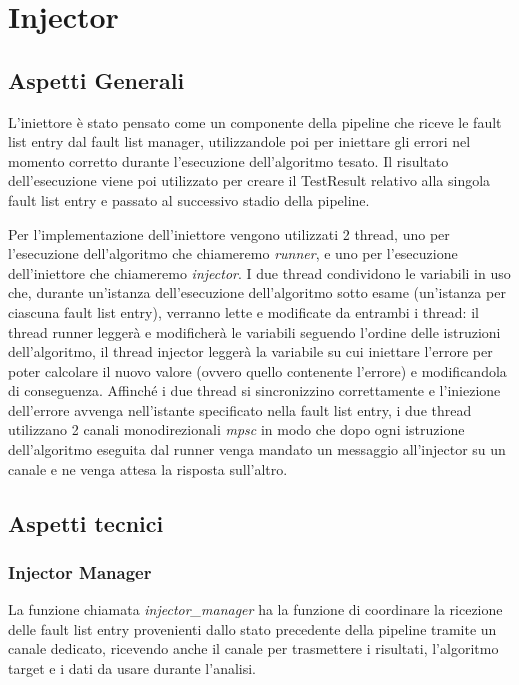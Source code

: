 \section{Injector}\label{sec: Injector}
\subsection{Aspetti Generali}
L'iniettore è stato pensato come un componente della pipeline che riceve le fault list entry dal fault list manager, utilizzandole poi per iniettare gli errori nel momento 
corretto durante l'esecuzione dell'algoritmo tesato. Il risultato dell'esecuzione viene poi utilizzato per creare il TestResult relativo alla singola fault list entry e passato 
al successivo stadio della pipeline. 

Per l'implementazione dell'iniettore vengono utilizzati 2 thread, uno per l'esecuzione dell'algoritmo che chiameremo \textit{runner}, e uno per l'esecuzione dell'i\-niettore che 
chiameremo \textit{injector}. I due thread condividono le variabili in uso che, durante un'istanza dell'esecuzione dell'algoritmo sotto esame (un'istanza per ciascuna fault list 
entry), verranno lette e modificate da entrambi i thread: il thread runner leggerà e modificherà le variabili seguendo l'ordine delle istruzioni dell'algoritmo, il thread
injector leggerà la variabile su cui iniettare l'errore per poter calcolare il nuovo valore (ovvero quello contenente l'errore) e modificandola di conseguenza. Affinché i due 
thread si sincronizzino correttamente e l'iniezione dell'errore avvenga nell'istante specificato nella fault list entry, i due thread utilizzano 2 canali monodirezionali \textit{mpsc} in modo che 
dopo ogni istruzione dell'algoritmo eseguita dal runner venga mandato un messaggio all'injector su un canale e ne venga attesa la risposta sull'altro.

\subsection{Aspetti tecnici}
\subsubsection{Injector Manager}
La funzione chiamata \textit{injector\_manager} ha la funzione di coordinare la ricezione delle fault list entry provenienti dallo stato precedente della pipeline tramite un canale dedicato, ricevendo anche il canale per trasmettere i risultati, l'algoritmo target e i dati da usare durante l'analisi.


